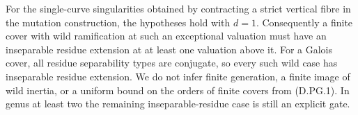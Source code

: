 \begin{remark}
For the single-curve singularities obtained by contracting a strict
vertical fibre in the mutation construction, the hypotheses hold
with $d=1$. Consequently a finite cover with wild ramification at
such an exceptional valuation must have an inseparable residue
extension at at least one valuation above it. For a Galois cover,
all residue separability types are conjugate, so every such wild
case has inseparable residue extension. We do not infer finite
generation, a finite image of wild inertia, or a uniform bound on
the orders of finite covers from (D.PG.1). In genus at least two
the remaining inseparable-residue case is still an explicit gate.
\end{remark}
